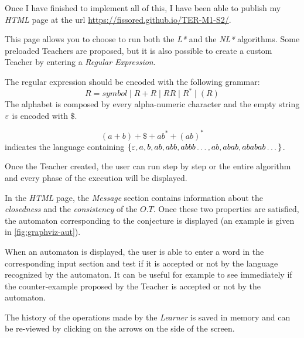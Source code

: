 Once I have finished to implement all of this, I have been able to publish my \textit{HTML} page at the url \url{https://fissored.github.io/TER-M1-S2/}.

This page allows you to choose to run both the \textit{L*} and the \textit{NL*} algorithms. Some preloaded Teachers are proposed, but it is also possible to create a custom Teacher by entering a \textit{Regular Expression}.

The regular expression should be encoded with the following grammar:
\[ R = symbol \mid R + R \mid RR \mid R^* \mid(R) \]
The alphabet is composed by every alpha-numeric character and the empty string $\varepsilon$ is encoded with $\$$.

\begin{example}
  \[(a + b)+\$+ab^*+(ab)^*\] indicates the language containing $\{\varepsilon,a, b,  ab, abb, abbb\dots, ab, abab, ababab\dots\}$.
\end{example}

Once the Teacher created, the user can run step by step or the entire algorithm and every phase of the execution will be displayed.

In the \textit{HTML} page, the \textit{Message} section contains information about the \textit{closedness} and the \textit{consistency} of the $O.T$. Once these two properties are satisfied, the automaton corresponding to the conjecture is displayed (an example is given in \cref{fig:graphviz-aut}).

When an automaton is displayed, the user is able to enter a word in the corresponding input section and test if it is accepted or not by the language recognized by the automaton. It can be useful for example to see immediately if the counter-example proposed by the Teacher is accepted or not by the automaton.

The history of the operations made by the \textit{Learner} is saved in memory and can be re-viewed by clicking on the arrows on the side of the screen.